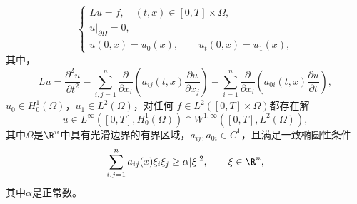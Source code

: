 \begin{enumerate}
\[\begin{cases}
            Lu=f, \quad (t,x)\in[0,T]\times\Omega,\\
            \left.u\right|_{\partial\Omega}=0,\\
            u(0,x)=u_0(x),\qquad u_t(0,x)=u_1(x),
        \end{cases}
    \]
    其中，
    \[
        Lu=\frac{\partial^2u}{\partial t^2}
        -\sum_{i,j=1}^n\frac{\partial}{\partial x_i}
        \left(a_{ij}(t,x)\frac{\partial u}{\partial x_j}\right)
        -\sum_{i=1}^n\frac{\partial}{\partial x_i}
        \left(a_{0i}(t,x)\frac{\partial u}{\partial t}\right),
    \]
    $u_0\in H_0^1(\Omega)$，$u_1\in L^2(\Omega)$，对任何
    $f\in L^2([0,T]\times\Omega)$都存在解
    \[
        u\in L^\infty([0,T],H_0^1(\Omega))
        \cap W^{1,\infty}([0,T],L^2(\Omega)),
    \]
    其中$\Omega$是$\R^n$中具有光滑边界的有界区域，$a_{ij},a_{0i}\in C^1$，且满足一致椭圆性条件
    \[
        \sum_{i,j=1}^n a_{ij}(x)\xi_i\xi_j
        \geq \alpha|\xi|^2,\qquad \xi\in\R^n,
    \]
    其中$\alpha$是正常数。
\end{enumerate}

